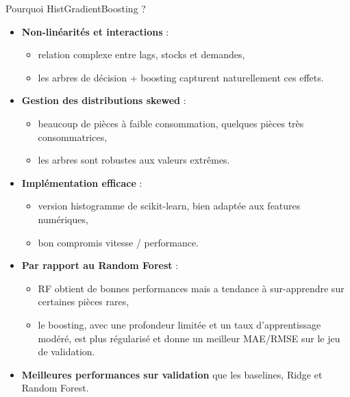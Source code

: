 \documentclass[aspectratio=169]{beamer}
\begin{document}
\begin{frame}{Pourquoi HistGradientBoosting ?}
  \begin{itemize}
    \item \textbf{Non-linéarités et interactions} :
      \begin{itemize}
        \item relation complexe entre lags, stocks et demandes,
        \item les arbres de décision + boosting capturent naturellement ces effets.
      \end{itemize}
    \item \textbf{Gestion des distributions skewed} :
      \begin{itemize}
        \item beaucoup de pièces à faible consommation, quelques pièces très consommatrices,
        \item les arbres sont robustes aux valeurs extrêmes.
      \end{itemize}
    \item \textbf{Implémentation efficace} :
      \begin{itemize}
        \item version histogramme de scikit-learn, bien adaptée aux features numériques,
        \item bon compromis vitesse / performance.
      \end{itemize}
    \item \textbf{Par rapport au Random Forest} :
      \begin{itemize}
        \item RF obtient de bonnes performances mais a tendance à sur-apprendre sur certaines pièces rares,
        \item le boosting, avec une profondeur limitée et un taux d'apprentissage modéré, est plus régularisé et
              donne un meilleur MAE/RMSE sur le jeu de validation.
      \end{itemize}
    \item \textbf{Meilleures performances sur validation} que les baselines, Ridge et Random Forest.
  \end{itemize}
\end{frame}
\end{document}
